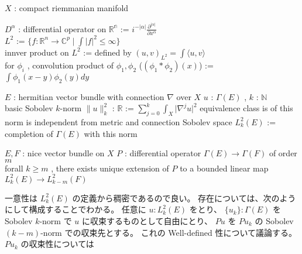 \begin{When}
\itemwhen
  \Fix \(X\) : compact riemmanian manifold
\end{When}

\begin{Definition}
\itemdefi
  \Define \(D^\alpha\) : differential operator on \(\mathbb{R^n}\) := \(i^{-\lvert \alpha \rvert} \frac{\partial^{\lvert \alpha \rvert}}{\partial x^\alpha}\) \\
  \Define \(L^2\) := \(\{f : \mathbb{R}^n \to \mathbb{C}^p \mid \int |f|^2 \leq \infty\}\) \\
  \Define innver product on \(L^2\) := defined by \((u,v)_{L^2} = \int \langle u , v \rangle\) \\
  \Define for \(\phi_i\) , convolution product of \(\phi_1 , \phi_2\) (\((\phi_1 * \phi_2)(x)\)) := \(\int \phi_1(x-y) \phi_2(y) dy\)
\end{Definition}

\begin{Definition}
\itemwhen
  \Fix \(E\) : hermitian vector bundle with connection \(\nabla\) over \(X\)
\itemdefi
  \For \(u\) : \(\Gamma(E)\) , \(k\) : \(\mathbb{N}\) \\
  \Define basic Sobolev \(k\)-norm \(\lVert u \rVert^2_k\) : \(\mathbb{R}\) := \(\sum_{j=0}^{k} \int_X \lvert \nabla^j u \rvert ^2\)
\itemprop
  \Then equivalence class is of this norm is independent from metric and connection
\itemprof
  \SORRY
\itemdefi
  \Define Sobolev space \(L^2_k(E)\) := completion of \(\Gamma(E)\) with this norm
\end{Definition}

\begin{Theorem}
\itemwhen
  \Fix \(E,F\) : nice vector bundle on \(X\)
\itemprop
  \For \(P\) : differential operator \(\Gamma(E) \to \Gamma(F)\) of order \(m\) \\
  \Then forall \(k \geq m\) , there exists unique extension of \(P\) to a bounded linear map \(L^2_k(E) \to L^2_{k-m}(F)\)
\end{Theorem}

\begin{Proof}
\itemprof
  一意性は \(L^2_k(E)\) の定義から稠密であるので良い。
  存在については、次のようにして構成することでわかる。
  任意に \(u : L^2_k(E)\) をとり、 \(\{u_k\} : \Gamma(E)\) を Sobolev \(k\)-norm で \(u\) に収束するものとして自由にとり、 \(P u\) を \(P u_k\) の Sobolev \((k-m)\)-norm での収束先とする。
  これの Well-defined 性について議論する。
  \(P u_k\) の収束性については \SORRY
\end{Proof}

